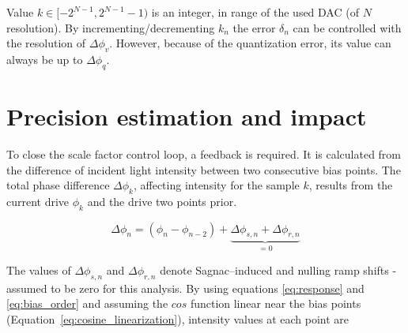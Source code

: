 \documentclass{article}
\begin{document}
\noindent
Value $k \in [-2^{N-1}, 2^{N-1}-1)$ is an integer, in range of the used DAC (of $N$ resolution). By incrementing/decrementing $k_{n}$ the error $\delta_{n}$ can be controlled with the resolution of $\Delta\phi_{v}$. However, because of the quantization error, its value can always be up to $\Delta\phi_{q}$.


\section{Precision estimation and impact}
To close the scale factor control loop, a feedback is required. It is calculated from the difference of incident light intensity between two consecutive bias points. The total phase difference $\Delta\phi_{k}$, affecting intensity for the sample $k$, results from the current drive $\phi_k$ and the drive two points prior.

\begin{equation}
    \Delta\phi_{n} = (\phi_{n} - \phi_{n-2}) + \underbrace{\Delta\phi_{s, n} + \Delta\phi_{r, n}}_{=0}
    \label{eq:phase_shift_difference}
\end{equation}

\noindent
The values of $\Delta\phi_{s, n}$ and $\Delta\phi_{r, n}$ denote Sagnac--induced and nulling ramp shifts - assumed to be zero for this analysis. By using equations \ref{eq:response} and \ref{eq:bias_order} and assuming the $cos$ function linear near the bias points (Equation~\ref{eq:cosine_linearization}), intensity values at each point are

\end{document}
